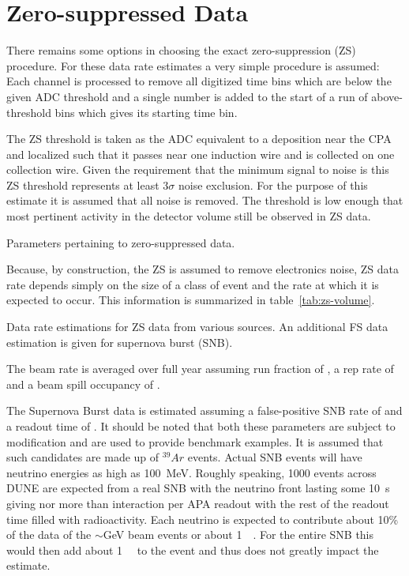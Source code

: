 \section{Zero-suppressed Data}

There remains some options in choosing the exact zero-suppression (ZS) procedure.
For these data rate estimates a very simple procedure is assumed: Each
channel is processed to remove all digitized time bins which are below
the given ADC threshold and a single number is added to the start of a
run of above-threshold bins which gives its starting time bin.

The ZS threshold is taken as the ADC equivalent to a
\chargezsthreshold
deposition near the CPA and localized such that it passes near one
induction wire and is collected on one collection wire.
Given the requirement that the minimum signal to noise is
\chargeminsignalnoiseratio this ZS threshold represents at least $3\sigma$
noise exclusion.
For the purpose of this estimate it is assumed that all noise is
removed.
The threshold is low enough that most pertinent activity in the
detector volume still be observed in ZS data.


\begin{table}[htbp]
  \centering
  \caption{Parameters pertaining to zero-suppressed data.}
  
  \label{tab:zs-parameters-table}
\end{table}

Because, by construction, the ZS is assumed to remove electronics
noise, ZS data rate depends simply on the size of a class of event and
the rate at which it is expected to occur.
This information is summarized in table~\ref{tab:zs-volume}.


\begin{table}[htbp]
  \centering
  \caption{Data rate estimations for ZS data from various sources.
  An additional FS data estimation is given for supernova burst (SNB).}
  
  \label{tab:zs-volume}
\end{table}

The beam rate is averaged over full year assuming run fraction of
\beamrunfraction, a rep rate of \beamreprate and a beam spill occupancy
of \beameventoccupancy.

The Supernova Burst data is estimated assuming a false-positive SNB
rate of \snbrate and a readout time of \snbreadouttime.
It should be noted that both these parameters are subject to
modification and are used to provide benchmark examples.
It is assumed that such candidates are made up of $^{39}Ar$ events.
Actual SNB events will have neutrino energies as high as
\SI{100}{\MeV}.
Roughly speaking, 1000 events across DUNE are expected from a real SNB
with the neutrino front lasting some \SI{10}{\second} giving nor more
than interaction per APA readout with the rest of the readout time
filled with radioactivity.
Each neutrino is expected to contribute about 10\% of the data of the
$\sim$\si{\GeV} beam events or about \SI{1}{\mega\byte}.
For the entire SNB this would then add about \SI{1}{\giga\byte} to the
event and thus does not greatly impact the estimate.


